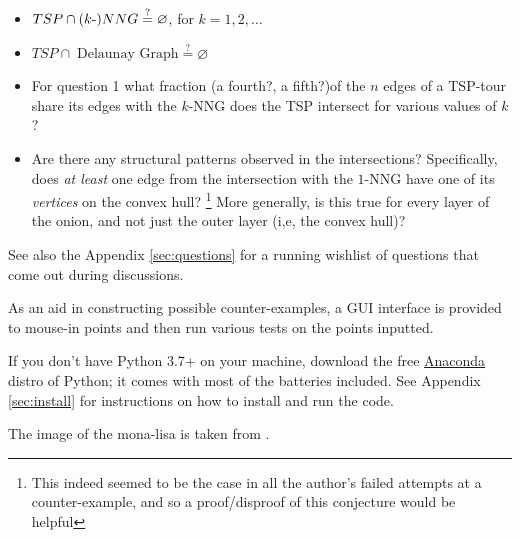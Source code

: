 \begin{description}
     \begin{itemize}
     \item $TSP \cap (k{\text -})NNG \stackrel{?}{=} \varnothing$, for $k=1,2,\ldots$
     \item $TSP \cap \; \text{Delaunay Graph} \stackrel{?}{=} \varnothing$
     \item For question 1 what fraction (a fourth?, a fifth?)of the $n$ edges of a TSP-tour share its edges with the  $k$-NNG does the TSP intersect for various values of $k$? 
     \item Are there any structural patterns observed in the intersections? Specifically, does \textit{at least } 
           one edge from the intersection with the $1$-NNG have one of its \textit{vertices} on the convex hull? 
           \footnote{This indeed seemed to be the case in all the author's failed attempts at a counter-example, and so a proof/disproof of this conjecture would be helpful}
           More generally, is this true for every layer of the onion, and not just the outer layer (i,e, the convex hull)?
     \end{itemize}

     See also the Appendix \autoref{sec:questions} for a running wishlist of questions that come out during discussions. 

     As an aid in constructing possible counter-examples, a GUI interface is provided to mouse-in points and then 
     run various tests on the points inputted. 
     
     If you don't have  Python 3.7+ on your machine, download the free  \href{https://www.anaconda.com/products/individual}{Anaconda} distro of Python; 
     it comes with most of the batteries included. See Appendix \autoref{sec:install} for instructions on how to install and run the code. 

     The image of the mona-lisa is taken from \cite{Sciencea2:online}.

\end{description}
